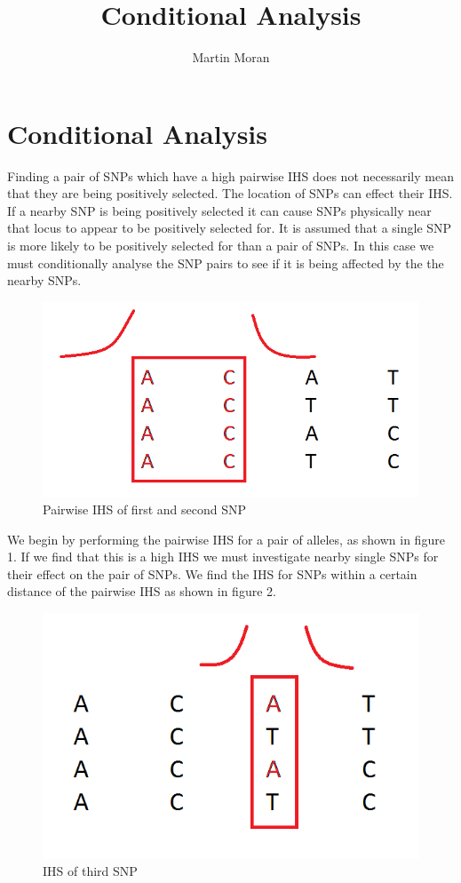 \documentclass[a4paper,12pt]{article}
\begin{document}
\title{Conditional Analysis}
\author{Martin Moran}
\maketitle

\section*{Conditional Analysis}
Finding a pair of SNPs which have a high pairwise IHS does not necessarily mean that they are being positively selected. The location of SNPs can effect their IHS. If a nearby SNP is being positively selected it can cause SNPs physically near that locus to appear to be positively selected for. It is assumed that a single SNP is more likely to be positively selected for than a pair of SNPs. In this case we must conditionally analyse the SNP pairs to see if it is being affected by the the nearby SNPs. 

\begin{figure}[h!]
  \centering
    \includegraphics[scale=0.5]{conditional1}
  \caption{Pairwise IHS of first and second SNP}
\end{figure}

We begin by performing the pairwise IHS for a pair of alleles, as shown in figure 1. If we find that this is a high IHS we must investigate nearby single SNPs for their effect on the pair of SNPs. We find the IHS for SNPs within a certain distance of the pairwise IHS as shown in figure 2.

\begin{figure}[h!]
  \centering
    \includegraphics[scale=0.5]{conditional2}
  \caption{IHS of third SNP}
\end{figure}
\end{document}
